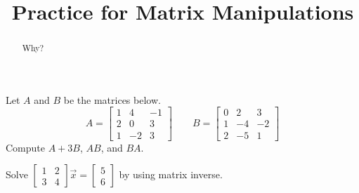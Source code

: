 \documentclass{ximera}
\title{Practice for Matrix Manipulations}
\begin{document}
\begin{abstract}
Why?
\end{abstract}
\maketitle


\begin{exercise}
    Let $A$ and $B$ be the matrices below.
    \[ 
        A = 
        \begin{bmatrix} 
            1 & 4 & -1 \\ 
            2 & 0 & 3 \\
            1 & -2 & 3 
        \end{bmatrix} 
        \qquad B = 
        \begin{bmatrix} 
            0 & 2 & 3 \\ 
            1 & -4 & -2 \\ 
            2 & -5 & 1 
        \end{bmatrix} 
    \]
    Compute $A + 3B$, $AB$, and $BA$. 
\end{exercise}

\begin{exercise}
    Solve
    $\left[ 
        \begin{smallmatrix}
            1 & 2 \\
            3 & 4 
        \end{smallmatrix} 
    \right] 
    \vec{x} =
    \left[ 
        \begin{smallmatrix}
            5 \\
            6
        \end{smallmatrix} 
    \right]$ by using matrix inverse.
\end{exercise}
\end{document}
